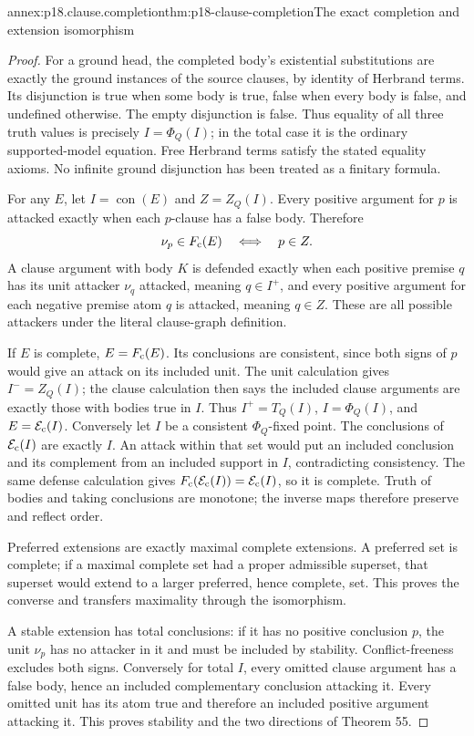 \begin{annexitem}{annex:p18.clause.completion}{thm:p18-clause-completion}{The exact completion and extension isomorphism}
\begin{proof}
For a ground head, the completed body's existential
substitutions are exactly the ground instances of
the source clauses, by identity of Herbrand terms.
Its disjunction is true when some body is true,
false when every body is false, and undefined
otherwise. The empty disjunction is false.
Thus equality of all three truth values is
precisely \(I=\Phi_Q(I)\); in the total case
it is the ordinary supported-model equation.
Free Herbrand terms satisfy the stated equality
axioms. No infinite ground disjunction has
been treated as a finitary formula.

For any \(E\), let \(I=\operatorname{con}(E)\)
and \(Z=Z_Q(I)\). Every positive argument
for \(p\) is attacked exactly when each
\(p\)-clause has a false body. Therefore
\[
 \nu_p\in F_{\rm c}(E)\quad\Longleftrightarrow\quad p\in Z.
\]
A clause argument with body \(K\) is defended
exactly when each positive premise \(q\)
has its unit attacker \(\nu_q\) attacked,
meaning \(q\in I^+\), and every positive
argument for each negative premise atom
\(q\) is attacked, meaning \(q\in Z\).
These are all possible attackers under
the literal clause-graph definition.

If \(E\) is complete, \(E=F_{\rm c}(E)\).
Its conclusions are consistent, since
both signs of \(p\) would give an
attack on its included unit. The unit
calculation gives \(I^-=Z_Q(I)\);
the clause calculation then says the
included clause arguments are exactly
those with bodies true in \(I\).
Thus \(I^+=T_Q(I)\), \(I=\Phi_Q(I)\),
and \(E={\cal E}_{\rm c}(I)\).
Conversely let \(I\) be a consistent
\(\Phi_Q\)-fixed point. The conclusions
of \({\cal E}_{\rm c}(I)\) are exactly
\(I\). An attack within that set would
put an included conclusion and its
complement from an included support
in \(I\), contradicting consistency.
The same defense calculation gives
\(F_{\rm c}({\cal E}_{\rm c}(I))
={\cal E}_{\rm c}(I)\), so it is
complete. Truth of bodies and taking
conclusions are monotone; the inverse
maps therefore preserve and reflect order.

Preferred extensions are exactly maximal
complete extensions. A preferred set is
complete; if a maximal complete set had
a proper admissible superset, that
superset would extend to a larger
preferred, hence complete, set. This
proves the converse and transfers
maximality through the isomorphism.

A stable extension has total conclusions:
if it has no positive conclusion \(p\),
the unit \(\nu_p\) has no attacker
in it and must be included by stability.
Conflict-freeness excludes both signs.
Conversely for total \(I\), every
omitted clause argument has a false
body, hence an included complementary
conclusion attacking it. Every omitted
unit has its atom true and therefore
an included positive argument attacking
it. This proves stability and the
two directions of Theorem 55.
\end{proof}
\end{annexitem}

